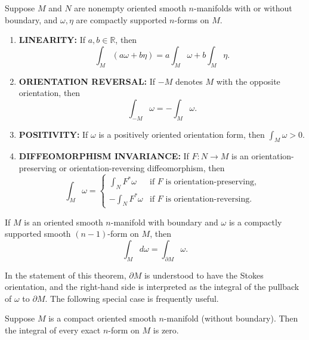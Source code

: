 \begin{proposition}
\label{prop:properties-integrals-forms}
Suppose $M$ and $N$ are nonempty oriented smooth $n$-manifolds with or without boundary, and $\omega, \eta$ are compactly supported $n$-forms on $M$.
\begin{enumerate}
\item[(a)] \textbf{LINEARITY:} If $a, b \in \mathbb{R}$, then
\[
\int_M (a\omega + b\eta) = a \int_M \omega + b \int_M \eta.
\]
\item[(b)] \textbf{ORIENTATION REVERSAL:} If $-M$ denotes $M$ with the opposite orientation, then
\[
\int_{-M} \omega = -\int_M \omega.
\]
\item[(c)] \textbf{POSITIVITY:} If $\omega$ is a positively oriented orientation form, then $\int_M \omega > 0$.
\item[(d)] \textbf{DIFFEOMORPHISM INVARIANCE:} If $F: N \to M$ is an orientation-preserving or orientation-reversing diffeomorphism, then
\[
\int_M \omega = \begin{cases}
\int_N F^*\omega & \text{if } F \text{ is orientation-preserving,} \\
-\int_N F^*\omega & \text{if } F \text{ is orientation-reversing.}
\end{cases}
\]
\end{enumerate}
\end{proposition}

\begin{theorem}
\label{thm:stokes-theorem}

If $M$ is an oriented smooth $n$-manifold with boundary and $\omega$ is a compactly supported smooth $(n-1)$-form on $M$, then
\begin{equation}
\int_M d\omega = \int_{\partial M} \omega. \tag{B.13}
\end{equation}
\end{theorem}

In the statement of this theorem, $\partial M$ is understood to have the Stokes orientation, and the right-hand side is interpreted as the integral of the pullback of $\omega$ to $\partial M$. The following special case is frequently useful.

\begin{corollary}
\label{cor:exact-integral-zero}

Suppose $M$ is a compact oriented smooth $n$-manifold (without boundary). Then the integral of every exact $n$-form on $M$ is zero.
\end{corollary}

